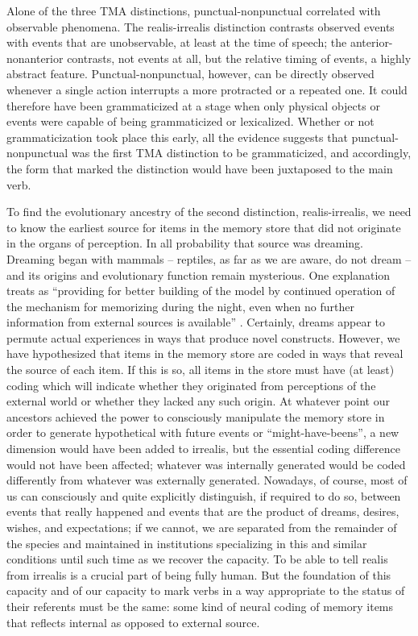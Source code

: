 Alone of the three TMA distinctions, punctual-nonpunctual correlated with observable phenomena. The realis-irrealis distinction contrasts observed events with events that are unobservable, at least at the time of speech; the anterior-nonanterior contrasts, not events at all, but the relative timing of events, a highly abstract feature. Punctual-nonpunctual, however, can be directly observed whenever a single action interrupts a more protracted or a repeated one. It could therefore have been grammaticized at a stage when only physical objects or events were capable of being grammaticized or lexicalized. Whether or not grammaticization took place this early, all the evidence suggests that punctual-nonpunctual was the first TMA distinction to be grammaticized, and accordingly, the form that marked the distinction would have been juxtaposed to the main verb. 

To find the evolutionary ancestry of the second distinction, realis-irrealis, we need to know the earliest source for items in the memory store that did not originate in the organs of perception. In all probability that source was dreaming. Dreaming began with mammals -- reptiles, as far as we are aware, do not dream -- and its origins and evolutionary function remain mysterious. One explanation treats  as ``providing for better building of the  model by continued operation of the mechanism for memorizing during the night, even when no further information from external sources is available'' \citep[209]{Young1978}. Certainly, dreams appear to permute actual experiences in ways that produce novel constructs. However, we have hypothesized that items in the memory store are coded in ways that reveal the source of each item. If this is so, all items in the store must have (at least) coding which will indicate whether they originated from perceptions
of the external world or whether they lacked any such origin. At whatever point our ancestors achieved the power to consciously manipulate the memory store in order to generate hypothetical with future events or ``might-have-beens'', a new dimension would have been added to irrealis, but the essential coding difference would not have been affected; whatever was internally generated would be coded differently from whatever was externally generated. Nowadays, of course, most of us can consciously and quite explicitly distinguish, if required to do so, between events that really happened and events that are the product of dreams, desires, wishes, and expectations; if we cannot, we are separated from the remainder of the species and maintained in institutions specializing in this and similar conditions until such time as we recover the capacity. To be able to tell realis from irrealis is a crucial part of being fully human. But the foundation of this capacity and of our capacity to mark verbs in a way appropriate to the status of their referents must be the same: some kind of neural coding of memory items that reflects internal as opposed to external source.

